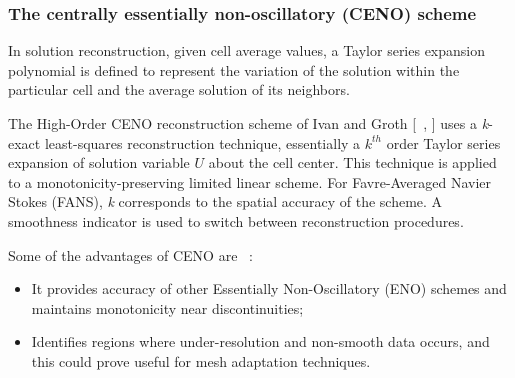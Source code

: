 \subsubsection{The centrally essentially non-oscillatory (CENO) scheme}
\label{section:CENO}
In solution reconstruction, given cell average values, a Taylor series expansion polynomial is defined to represent the variation of the solution within the particular cell and the average solution of its neighbors. \par
The High-Order CENO reconstruction scheme of Ivan and Groth [~\cite{ivan:2007}, \cite{ivan:2013b}] uses a \textit{k}-exact least-squares reconstruction technique, essentially a $k^{th}$ order Taylor series expansion of solution variable $U$ about the cell center. This technique is applied to a monotonicity-preserving limited linear scheme. For Favre-Averaged Navier Stokes (FANS), \textit{k} corresponds to the spatial accuracy of the scheme. A smoothness indicator is used to switch between reconstruction procedures.\par
Some of the advantages of CENO are ~\cite{Groth:2013}:
\begin{itemize}
\setlength\itemsep{0.1em}
\item It provides accuracy of other Essentially Non-Oscillatory (ENO) schemes and maintains monotonicity near discontinuities;
\item Identifies regions where under-resolution and non-smooth data occurs, and this could prove useful for mesh adaptation techniques.
\end{itemize}

